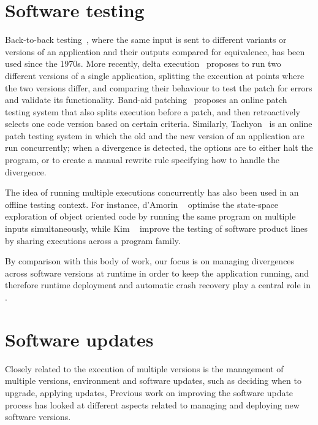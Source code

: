 \section{Software testing}

Back-to-back testing~\cite{back-to-back90}, where the same input is
sent to different variants or versions of an application and their
outputs compared for equivalence, has been used since the 1970s.  More
recently, delta execution~\cite{onlinevalidation} proposes to run two
different versions of a single application, splitting the execution at
points where the two versions differ, and comparing their behaviour to
test the patch for errors and validate its functionality.  Band-aid
patching~\cite{bandaid-patch07} proposes an online patch testing
system that also splits execution before a patch, and then
retroactively selects one code version based on certain criteria.
Similarly, Tachyon~\cite{tachyon12} is an online patch testing system
in which the old and the new version of an application are run
concurrently; when a divergence is detected, the options are to either
halt the program, or to create a manual rewrite rule specifying how to
handle the divergence.

The idea of running multiple executions concurrently has also been
used in an offline testing context.  For instance,
d'Amorin \etal~\cite{delta-exec-oop} optimise the state-space
exploration of object oriented code by running the same program on
multiple inputs simultaneously, while Kim \etal~\cite{shared-exec12}
improve the testing of software product lines by sharing executions
across a program family.

By comparison with this body of work, our focus is on managing
divergences across software versions at runtime in order to keep the
application running, and therefore runtime deployment and automatic
crash recovery play a central role in \mx.

\section{Software updates}

Closely related to the execution of multiple versions is the management of
multiple versions, environment and software updates, such as deciding when to
upgrade, applying updates, \etc Previous work on improving the software update
process has looked at different aspects related to managing and deploying new
software versions. 

